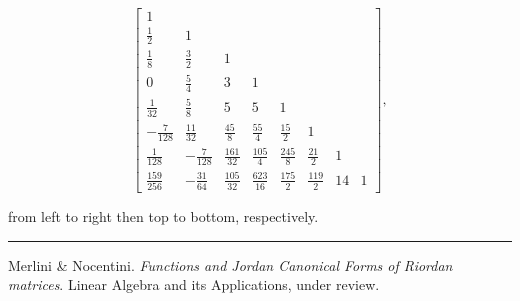 \documentclass[9pt]{beamer}
\begin{document}
\begin{frame}[fragile]
\begin{displaymath}
       \left[\begin{matrix}1 &  &  &  &  &  &  & \\\frac{1}{2} & 1 &  &  &  &  &  & \\\frac{1}{8} & \frac{3}{2} & 1 &  &  &  &  & \\0 & \frac{5}{4} & 3 & 1 &  &  &  & \\\frac{1}{32} & \frac{5}{8} & 5 & 5 & 1 &  &  & \\- \frac{7}{128} & \frac{11}{32} & \frac{45}{8} & \frac{55}{4} & \frac{15}{2} & 1 &  & \\\frac{1}{128} & - \frac{7}{128} & \frac{161}{32} & \frac{105}{4} & \frac{245}{8} & \frac{21}{2} & 1 & \\\frac{159}{256} & - \frac{31}{64} & \frac{105}{32} & \frac{623}{16} & \frac{175}{2} & \frac{119}{2} & 14 & 1\end{matrix}\right],
    \end{displaymath}

    from left to right then top to bottom, respectively.

\vfill
\noindent\rule{\textwidth}{0.1pt}
{\footnotesize
Merlini \& Nocentini. \textit{Functions and Jordan Canonical Forms of Riordan
matrices}. \newline Linear Algebra and its Applications, under review.}
\end{frame}
\end{document}
